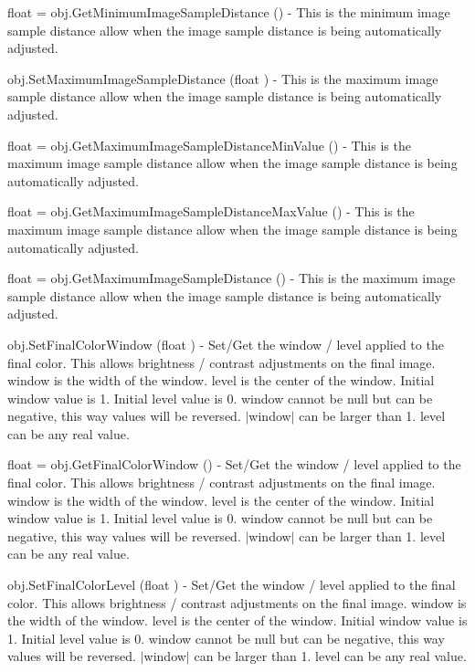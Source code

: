 \begin{DoxyItemize}
\item {\ttfamily float = obj.\-Get\-Minimum\-Image\-Sample\-Distance ()} -\/ This is the minimum image sample distance allow when the image sample distance is being automatically adjusted.  
\item {\ttfamily obj.\-Set\-Maximum\-Image\-Sample\-Distance (float )} -\/ This is the maximum image sample distance allow when the image sample distance is being automatically adjusted.  
\item {\ttfamily float = obj.\-Get\-Maximum\-Image\-Sample\-Distance\-Min\-Value ()} -\/ This is the maximum image sample distance allow when the image sample distance is being automatically adjusted.  
\item {\ttfamily float = obj.\-Get\-Maximum\-Image\-Sample\-Distance\-Max\-Value ()} -\/ This is the maximum image sample distance allow when the image sample distance is being automatically adjusted.  
\item {\ttfamily float = obj.\-Get\-Maximum\-Image\-Sample\-Distance ()} -\/ This is the maximum image sample distance allow when the image sample distance is being automatically adjusted.  
\item {\ttfamily obj.\-Set\-Final\-Color\-Window (float )} -\/ Set/\-Get the window / level applied to the final color. This allows brightness / contrast adjustments on the final image. window is the width of the window. level is the center of the window. Initial window value is 1. Initial level value is 0. window cannot be null but can be negative, this way values will be reversed. $|$window$|$ can be larger than 1. level can be any real value.  
\item {\ttfamily float = obj.\-Get\-Final\-Color\-Window ()} -\/ Set/\-Get the window / level applied to the final color. This allows brightness / contrast adjustments on the final image. window is the width of the window. level is the center of the window. Initial window value is 1. Initial level value is 0. window cannot be null but can be negative, this way values will be reversed. $|$window$|$ can be larger than 1. level can be any real value.  
\item {\ttfamily obj.\-Set\-Final\-Color\-Level (float )} -\/ Set/\-Get the window / level applied to the final color. This allows brightness / contrast adjustments on the final image. window is the width of the window. level is the center of the window. Initial window value is 1. Initial level value is 0. window cannot be null but can be negative, this way values will be reversed. $|$window$|$ can be larger than 1. level can be any real value.  

\end{DoxyItemize}
